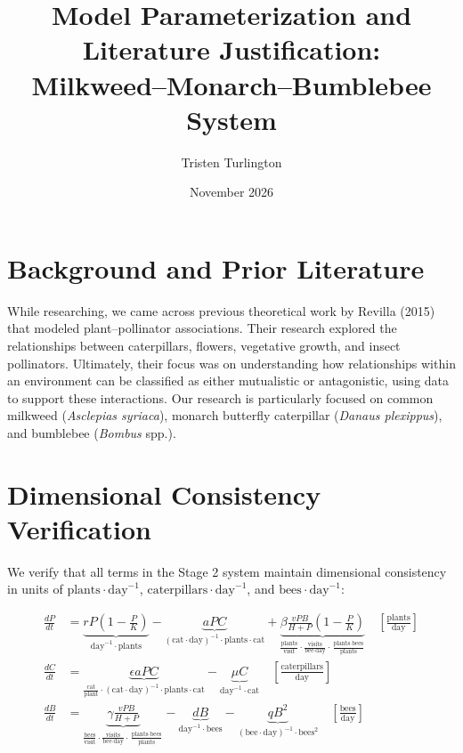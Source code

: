 \documentclass[11pt]{article}
\title{Model Parameterization and Literature Justification:\\Milkweed--Monarch--Bumblebee System}
\author{Tristen Turlington}
\date{November 2026}
\begin{document}
\maketitle

\section{Background and Prior Literature}
While researching, we came across previous theoretical work by Revilla (2015)~\cite{revilla2015} that modeled plant--pollinator associations. Their research explored the relationships between caterpillars, flowers, vegetative growth, and insect pollinators. Ultimately, their focus was on understanding how relationships within an environment can be classified as either mutualistic or antagonistic, using data to support these interactions. Our research is particularly focused on common milkweed (\textit{Asclepias syriaca}), monarch butterfly caterpillar (\textit{Danaus plexippus}), and bumblebee (\textit{Bombus} spp.).

\section{Dimensional Consistency Verification}
We verify that all terms in the Stage 2 system maintain dimensional consistency in units of $\text{plants}\cdot\text{day}^{-1}$, $\text{caterpillars}\cdot\text{day}^{-1}$, and $\text{bees}\cdot\text{day}^{-1}$:

\begin{align}
\frac{dP}{dt} &= \underbrace{rP\left(1-\frac{P}{K}\right)}_{\text{day}^{-1}\cdot\text{plants}} 
                 - \underbrace{aPC}_{(\text{cat}\cdot\text{day})^{-1}\cdot\text{plants}\cdot\text{cat}} 
                 + \underbrace{\beta \frac{vPB}{H+P}\left(1-\frac{P}{K}\right)}_{\frac{\text{plants}}{\text{visit}}\cdot\frac{\text{visits}}{\text{bee}\cdot\text{day}}\cdot\frac{\text{plants}\cdot\text{bees}}{\text{plants}}} 
                 \quad \left[\frac{\text{plants}}{\text{day}}\right] \\[6pt]
\frac{dC}{dt} &= \underbrace{\epsilon a P C}_{\frac{\text{cat}}{\text{plant}}\cdot(\text{cat}\cdot\text{day})^{-1}\cdot\text{plants}\cdot\text{cat}} 
                 - \underbrace{\mu C}_{\text{day}^{-1}\cdot\text{cat}} 
                 \quad \left[\frac{\text{caterpillars}}{\text{day}}\right] \\[6pt]
\frac{dB}{dt} &= \underbrace{\gamma \frac{vPB}{H+P}}_{\frac{\text{bees}}{\text{visit}}\cdot\frac{\text{visits}}{\text{bee}\cdot\text{day}}\cdot\frac{\text{plants}\cdot\text{bees}}{\text{plants}}} 
                 - \underbrace{dB}_{\text{day}^{-1}\cdot\text{bees}} 
                 - \underbrace{qB^2}_{(\text{bee}\cdot\text{day})^{-1}\cdot\text{bees}^2} 
                 \quad \left[\frac{\text{bees}}{\text{day}}\right]
\end{align}
\end{document}
